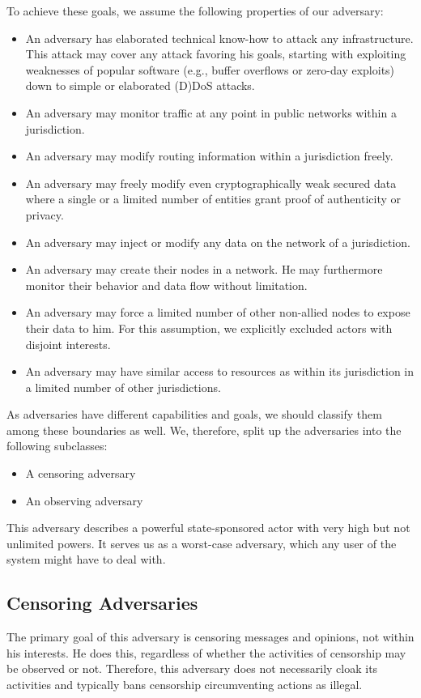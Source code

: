 To achieve these goals, we assume the following properties of our adversary:
\begin{itemize}
	\item An adversary has elaborated technical know-how to attack any infrastructure. This attack may cover any attack favoring his goals, starting with exploiting weaknesses of popular software (e.g., buffer overflows or zero-day exploits) down to simple or elaborated (D)DoS attacks.
	\item An adversary may monitor traffic at any point in public networks within a jurisdiction.
	\item An adversary may modify routing information within a jurisdiction freely.
	\item An adversary may freely modify even cryptographically weak secured data where a single or a limited number of entities grant proof of authenticity or privacy.
	\item An adversary may inject or modify any data on the network of a jurisdiction.
	\item An adversary may create their nodes in a network. He may furthermore monitor their behavior and data flow without limitation.
	\item An adversary may force a limited number of other non-allied nodes to expose their data to him. For this assumption, we explicitly excluded actors with disjoint interests.
	\item An adversary may have similar access to resources as within its jurisdiction in a limited number of other jurisdictions.
\end{itemize}

As adversaries have different capabilities and goals, we should classify them among these boundaries as well. We, therefore, split up the adversaries into the following subclasses:
\begin{itemize}
	\item A censoring adversary
	\item An observing adversary
\end{itemize}

This adversary describes a powerful state-sponsored actor with very high but not unlimited powers. It serves us as a worst-case adversary, which any user of the system might have to deal with.

\subsection{Censoring Adversaries}
The primary goal of this adversary is censoring messages and opinions, not within his interests. He does this, regardless of whether the activities of censorship may be observed or not. Therefore, this adversary does not necessarily cloak its activities and typically bans censorship circumventing actions as illegal.

